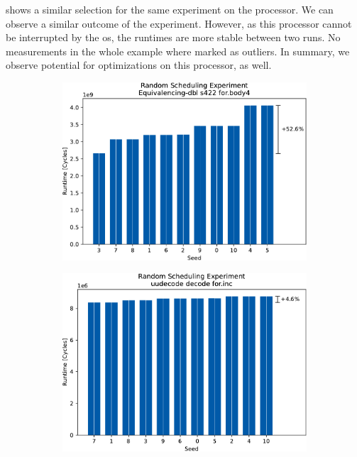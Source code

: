  shows a similar selection for the same experiment on the \aurora processor.
We can observe a similar outcome of the experiment.
However, as this processor cannot be interrupted by the \ac{os}, the runtimes are more stable between two runs.
No measurements in the whole example where marked as outliers.
In summary, we observe potential for optimizations on this processor, as well.
\begin{figure}
    \begin{subfigure}{0.0325\textwidth}\caption{}\label{fig:eval:rndm:aurora:a}\end{subfigure}
    \begin{subfigure}{0.44\textwidth}
        \includegraphics[width=\textwidth]{img/random-scheduling-experiment-aurora-collected/Equivalencing-dbl-crop.pdf}
    \end{subfigure}
    \hfill
    \begin{subfigure}{0.0325\textwidth}\caption{}\label{fig:eval:rndm:aurora:b}\end{subfigure}
    \begin{subfigure}{0.44\textwidth}
        \includegraphics[width=\textwidth]{img/random-scheduling-experiment-aurora-collected/uudecode-crop.pdf}
    \end{subfigure}


\end{figure}
